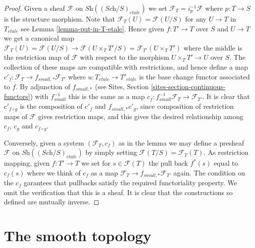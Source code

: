 \begin{proof}
Given a sheaf $\mathcal{F}$ on $\textit{Sh}((\textit{Sch}/S)_{etale})$
we set $\mathcal{F}_T = i_p^{-1}\mathcal{F}$ where $p : T \to S$
is the structure morphism. Note that
$\mathcal{F}_T(U) = \mathcal{F}(U/S)$ for any $U \to T$
in $T_{etale}$ see Lemma \ref{lemma-put-in-T-etale}.
Hence given $f : T' \to T$ over $S$ and $U \to T$ we get a canonical
map $\mathcal{F}_T(U) = \mathcal{F}(U/S) \to \mathcal{F}(U\times_TT'/S)
= \mathcal{F}_{T'}(U\times_T T')$ where the middle is the restriction map
of $\mathcal{F}$ with respect to the morphism
$U \times_TT' \to U$ over $S$. The collection of these maps are
compatible with restrictions, and hence define a map
$c'_f : \mathcal{F}_T \to f_{small, *}\mathcal{F}_{T'}$ where
$u : T_{etale} \to T'_{etale}$ is the base change functor associated
to $f$. By adjunction of $f_{small, *}$ (see
Sites, Section \ref{sites-section-continuous-functors}) with
$f_{small}^{-1}$ this is the same as a map
$c_f : f_{small}^{-1}\mathcal{F}_T \to \mathcal{F}_{T'}$.
It is clear that $c'_{f \circ g}$ is the composition of
$c'_f$ and $f_{small, *}c'_g$, since composition of restriction maps
of $\mathcal{F}$ gives restriction maps, and this gives the desired
relationship among $c_f$, $c_g$ and $c_{f \circ g}$.

\medskip\noindent
Conversely, given a system $(\mathcal{F}_T, c_f)$ as in the lemma
we may define a presheaf $\mathcal{F}$ on
$\textit{Sh}((\textit{Sch}/S)_{etale})$
by simply setting $\mathcal{F}(T/S) = \mathcal{F}_T(T)$. As restriction
mapping, given $f : T' \to T$ we set for $s \in \mathcal{F}(T)$
the pull back $f^*(s)$ equal to $c_f(s)$ where we think of $c_f$ as
a map $\mathcal{F}_T \to f_{small, *}\mathcal{F}_{T'}$ again.
The condition on the $c_f$ garantees that
pullbacks satisfy the required functoriality property.
We omit the verification that this is a sheaf.
It is clear that the constructions so defined are mutually inverse.
\end{proof}























\section{The smooth topology}
\label{section-smooth}


